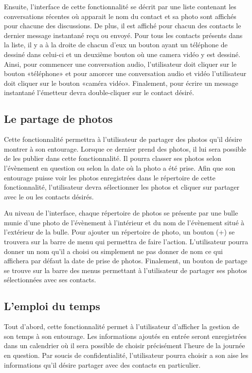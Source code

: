 \documentclass[11pt]{article}
\begin{document}
	Ensuite, l’interface de cette fonctionnalité se décrit par une liste contenant les conversations récentes où apparait le nom du contact et sa photo sont affichés pour chacune des discussions. De plus, il est affiché pour chacun des contacts le dernier message instantané reçu ou envoyé. Pour tous les contacts présents dans la liste, il y a à la droite de chacun d’eux un bouton ayant un téléphone de dessiné dans celui-ci et un deuxième bouton où une camera vidéo y est dessiné. Ainsi, pour commencer une conversation audio, l’utilisateur doit cliquer sur le bouton «téléphone» et pour amorcer une conversation audio et vidéo l’utilisateur doit cliquer sur le bouton «caméra vidéo». Finalement, pour écrire un message instantané l’émetteur devra double-cliquer sur le contact désiré.
\subsection{Le partage de photos}\label{par:photos}
Cette fonctionnalité permettra à l’utilisateur de partager des photos qu’il désire montrer à son entourage. Lorsque ce dernier prend des photos, il lui sera possible de les publier dans cette fonctionnalité. Il pourra classer ses photos selon l’évènement en question ou selon la date où la photo a été prise. Afin que son entourage puisse voir les photos enregistrées dans le répertoire de cette fonctionnalité, l’utilisateur devra sélectionner les photos et cliquer sur partager avec le ou les contacts désirés.

Au niveau de l’interface,  chaque répertoire de photos se présente par une bulle munie d’une photo de l’évènement à l’intérieur et du nom de l’évènement situé à l’extérieur de la bulle. Pour ajouter un répertoire de photo, un bouton (+) se trouvera sur la barre de menu qui permettra de faire l’action. L’utilisateur pourra donner un nom qu’il a choisi ou simplement ne pas donner de nom ce qui affichera par défaut la date de prise de photos. Finalement, un bouton de partage se trouve sur la barre des menus permettant à l’utilisateur de partager ses photos sélectionnées avec ses contacts.
\subsection{L'emploi du temps}\label{par:cal}
Tout d’abord,  cette fonctionnalité permet à l’utilisateur d’afficher la gestion de son temps à son entourage. Les informations ajoutés en entrée seront enregistrées dans un calendrier où il sera possible de choisir précisément l’heure de la journée en question. Par soucis de confidentialité, l’utilisateur pourra choisir a son aise les informations qu'il désire partager avec des contacts en particulier.
\end{document}
